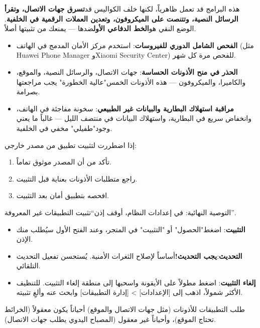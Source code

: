 هذه البرامج قد تعمل ظاهرياً، لكنها خلف الكواليس قد\textbf{تسرق جهات الاتصال، وتقرأ الرسائل النصية، وتتنصت على الميكروفون، وتعدين العملات الرقمية في الخلفية}. الوضع النقي هو\textbf{الخط الدفاعي الأول}ضدها — يمنعك من تثبيتها أصلاً.


\begin{itemize}
  \item \textbf{الفحص الشامل الدوري للفيروسات}: استخدم مركز الأمان المدمج في الهاتف (مثل Huawei Phone Manager وXiaomi Security Center) للفحص مرة كل شهر.
  \item \textbf{الحذر في منح الأذونات الحساسة}: جهات الاتصال، والرسائل النصية، والموقع، والكاميرا، والميكروفون — هذه الأذونات الخمس"عالية الخطورة" يجب مراجعتها بصرامة.
  \item \textbf{مراقبة استهلاك البطارية والبيانات غير الطبيعي}: سخونة مفاجئة في الهاتف، وانخفاض سريع في البطارية، واستهلاك البيانات في منتصف الليل — غالباً ما يعني وجود"طفيلي" مخفي في الخلفية.
\end{itemize}

إذا اضطررت لتثبيت تطبيق من مصدر خارجي:

\begin{enumerate}
  \item تأكد من أن المصدر موثوق تماماً.
  \item راجع متطلبات الأذونات بعناية قبل التثبيت.
  \item افحصه بتطبيق أمان بعد التثبيت.
\end{enumerate}

التوصية النهائية: في إعدادات النظام، أوقف إذن“تثبيت التطبيقات غير المعروفة”.


\begin{itemize}
  \item \textbf{التثبيت}: اضغط"الحصول" أو "التثبيت" في المتجر، وعند الفتح الأول سيُطلب منك الإذن.
  \item \textbf{التحديث}:\textbf{يجب التحديث!}أساساً لإصلاح الثغرات الأمنية. يُستحسن تفعيل التحديث التلقائي.
  \item \textbf{إلغاء التثبيت}: اضغط مطولاً على الأيقونة واسحبها إلى منطقة إلغاء التثبيت. للتنظيف الأكثر شمولاً، اذهب إلى [الإعدادات] > [إدارة التطبيقات] وابحث عنه وألغِ تثبيته.
\end{itemize}


طلب التطبيقات للأذونات (مثل جهات الاتصال والموقع) أحياناً يكون معقولاً (الخرائط تحتاج الموقع)، وأحياناً غير معقول (المصباح اليدوي يطلب جهات الاتصال).

